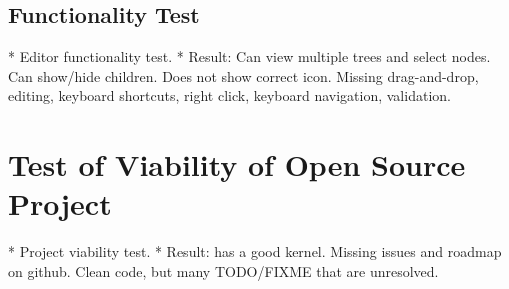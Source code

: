 \subsection{Functionality Test}
* Editor functionality test.
  * Result: Can view multiple trees and select nodes. Can show/hide children. Does not show correct icon. Missing drag-and-drop, editing, keyboard shortcuts, right click, keyboard navigation, validation.

\section{Test of Viability of Open Source Project}
* Project viability test.
  * Result: has a good kernel. Missing issues and roadmap on github. Clean code, but many TODO/FIXME that are unresolved. 
  